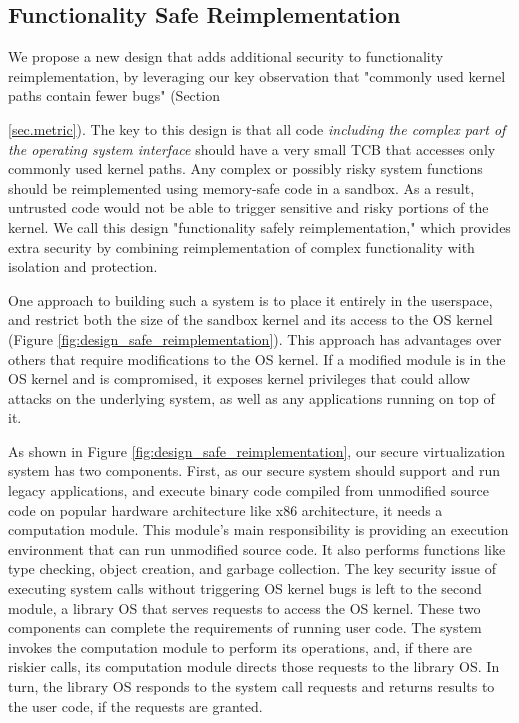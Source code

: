 
\subsection{Functionality Safe Reimplementation}
We propose a new design that adds additional security to
functionality reimplementation, by leveraging our key observation
 that "commonly used kernel paths contain fewer bugs"
(Section {\ref{sec.metric}).
The key to this design is that all code \emph{including the complex part
of the operating system interface} should have a very small TCB that accesses only
commonly used kernel paths. Any complex or possibly risky system functions
should be reimplemented using memory-safe code in a sandbox.
As a result, untrusted code would not be able to
trigger sensitive and risky portions of the kernel.
We call this design "functionality safely reimplementation,"
which provides extra security by combining reimplementation of
complex functionality with isolation and protection.

One approach to building such a system is to place it entirely in the userspace,
and restrict both the size of the sandbox kernel and its access to the
OS kernel (Figure \ref{fig:design_safe_reimplementation}).
This approach has advantages over others that require modifications to
the OS kernel.
If a modified module is in the OS kernel and is compromised, it exposes
kernel privileges that could allow attacks
on the underlying system, as well as any applications running on top of it.

As shown in Figure \ref{fig:design_safe_reimplementation}, our secure virtualization system
has two components. First, as our secure system should support and run legacy applications,
and execute binary code compiled from unmodified source code on popular hardware architecture
like x86 architecture, it needs a computation module.
This module's main responsibility is providing an execution environment
that can run unmodified source code. It also performs functions like type checking,
object creation, and garbage collection.
The key security issue of executing system calls
without triggering OS kernel bugs is left to the second module, a library OS
that serves requests to access the OS kernel.
These two components can complete the requirements of running user code.
The system invokes the computation module to perform its operations,
and, if there are riskier calls, its computation module directs those requests to the
library OS. In turn, the library OS responds to the system call requests and
returns results to the user code, if the requests are granted.

}
